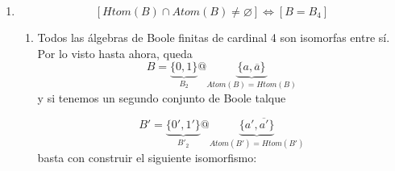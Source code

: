 \begin{enumerate}
\begin{enumerate}
\begin{enumerate}
\begin{enumerate}
        \begin{enumerate}
        \def\labelenumv{\arabic{enumv}.}
        \tightlist
        \item
          \[y = \overline{x}\]
        \item
          \[y \in {\{{x,\overline{x}}\}}\]
        \end{enumerate}
      \item
        Como
        \[\mathit{Atom}{{(B_{2})} \cap \mathit{Htom}}{{(B_{2})} = \varnothing}\Rightarrow\forall{y \in B_{\ast}^{\ast}}{y \in {\{{x,\overline{x}}\}}}\]
      \item
        \[\mathit{Atom}{{(B)} \cup \mathit{Htom}}{{{{(B)} \cup {\{ 1,0\}}} = {{\{{x,\overline{x}}\}} \cup {\{ 1,0\}}}} = {\{{1,x,\overline{x},0}\}}}\]
      \item
        \[\forall{y \in B^{\ast}}{{y \cdot \overline{x}} \in {\{{\overline{x},0}\}}}\]
      \item
        \[\mathit{Atom}{{(B)} = {\{{x,\overline{x}}\}}}\]
      \item
        \[\forall{y \in B_{\ast}}{{y + \overline{x}} \in {\{{1,\overline{x}}\}}}\]
      \item
        \[\mathit{Htom}{{(B)} = {\{{x,\overline{x}}\}}}\]
      \item
        \[{{B = {\{{1,x,\overline{x},0}\}}} = {{\{ 1,0\}} \cup \mathit{Atom}}}{{(B)} = {{\{ 1,0\}} \cup \mathit{Htom}}}{(B)}\]
      \item
        \[\mathit{Atom}{{(B)} = \mathit{Htom}}{(B)}\]
      \item
        \[B = B_{4}\]
      \end{enumerate}
    \item
      \[\left\lbrack {\mathit{Htom}{{(B)} \cap \mathit{Atom}}{{(B)} \neq \varnothing}} \right\rbrack\Leftrightarrow\left\lbrack {B = B_{4}} \right\rbrack\]

      \begin{enumerate}
      \def\labelenumiv{\arabic{enumiv}.}
      \item
        Todos las álgebras de Boole finitas de cardinal 4 son isomorfas
        entre sí. Por lo visto hasta ahora, queda
        \[{B = \underset{B_{2}}{\underbrace{\{ 0,1\}}}}@\underset{\mathit{Atom}{{(B)} = \mathit{Htom}}{(B)}}{\underbrace{\{{a,\overline{a}}\}}}\]y
        si tenemos un segundo conjunto de Boole talque

        \[B{' = \underset{B'_{2}}{\underbrace{\{{0',1'}\}}}}@\underset{\mathit{Atom}{{({B'})} = \mathit{Htom}}{({B'})}}{\underbrace{\{{a',\overline{a'}}\}}}\]basta
        con construir el siguiente isomorfismo:


\end{enumerate}
\end{enumerate}
\end{enumerate}
\end{enumerate}
